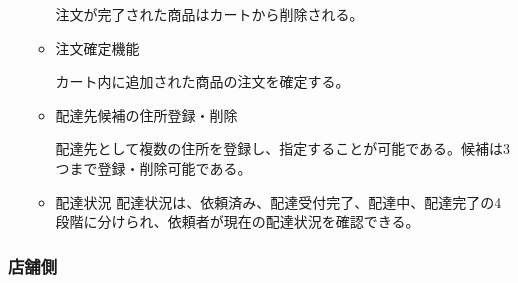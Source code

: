 \begin{itemize}
\begin{itemize}
        注文が完了された商品はカートから削除される。

        
        \item 注文確定機能
        
        カート内に追加された商品の注文を確定する。
        
        \item 配達先候補の住所登録・削除
        
        配達先として複数の住所を登録し、指定することが可能である。候補は3つまで登録・削除可能である。
        
        \item 配達状況
        配達状況は、依頼済み、配達受付完了、配達中、配達完了の4段階に分けられ、依頼者が現在の配達状況を確認できる。
    \end{itemize}
  
\end{itemize}



\subsubsection{店舗側}


